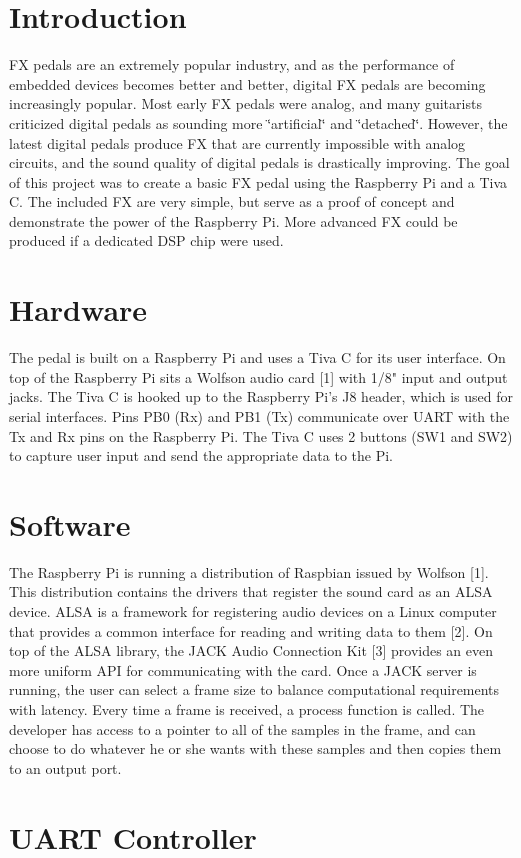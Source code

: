 \hypertarget{index_introduction}{}\section{Introduction}\label{index_introduction}
F\+X pedals are an extremely popular industry, and as the performance of embedded devices becomes better and better, digital F\+X pedals are becoming increasingly popular. Most early F\+X pedals were analog, and many guitarists criticized digital pedals as sounding more \char`\"{}artificial\char`\"{} and \char`\"{}detached\char`\"{}. However, the latest digital pedals produce F\+X that are currently impossible with analog circuits, and the sound quality of digital pedals is drastically improving. The goal of this project was to create a basic F\+X pedal using the Raspberry Pi and a Tiva C. The included F\+X are very simple, but serve as a proof of concept and demonstrate the power of the Raspberry Pi. More advanced F\+X could be produced if a dedicated D\+S\+P chip were used.\hypertarget{index_hardware}{}\section{Hardware}\label{index_hardware}
The pedal is built on a Raspberry Pi and uses a Tiva C for its user interface. On top of the Raspberry Pi sits a Wolfson audio card \mbox{[}1\mbox{]} with 1/8" input and output jacks. The Tiva C is hooked up to the Raspberry Pi's J8 header, which is used for serial interfaces. Pins P\+B0 (Rx) and P\+B1 (Tx) communicate over U\+A\+R\+T with the Tx and Rx pins on the Raspberry Pi. The Tiva C uses 2 buttons (S\+W1 and S\+W2) to capture user input and send the appropriate data to the Pi.\hypertarget{index_software}{}\section{Software}\label{index_software}
The Raspberry Pi is running a distribution of Raspbian issued by Wolfson \mbox{[}1\mbox{]}. This distribution contains the drivers that register the sound card as an A\+L\+S\+A device. A\+L\+S\+A is a framework for registering audio devices on a Linux computer that provides a common interface for reading and writing data to them \mbox{[}2\mbox{]}. On top of the A\+L\+S\+A library, the J\+A\+C\+K Audio Connection Kit \mbox{[}3\mbox{]} provides an even more uniform A\+P\+I for communicating with the card. Once a J\+A\+C\+K server is running, the user can select a frame size to balance computational requirements with latency. Every time a frame is received, a process function is called. The developer has access to a pointer to all of the samples in the frame, and can choose to do whatever he or she wants with these samples and then copies them to an output port.\hypertarget{index_uart}{}\section{U\+A\+R\+T Controller}\label{index_uart}
